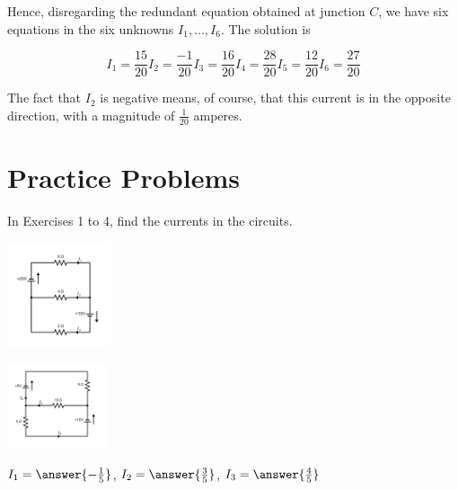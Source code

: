 \documentclass{ximera}
\begin{document}
\begin{example}
\begin{explanation}
Hence, disregarding the redundant equation obtained at junction $C$, we have six equations in the six unknowns $I_1, \dots, I_6$. The solution is

$$	I_1 = \frac{15}{20} I_2 = \frac{-1}{20}I_3 = \frac{16}{20} I_4 = \frac{28}{20}I_5 = \frac{12}{20}I_6 = \frac{27}{20}$$

The fact that $I_2$ is negative means, of course, that this current is in the opposite direction, with a magnitude of $\frac{1}{20}$ amperes.

\end{explanation}

\end{example}

\section*{Practice Problems}

In Exercises 1 to 4, find the currents in the circuits.

\begin{problem}\label{prob:circuit1}
\begin{image}
   
\includegraphics[height=1.2in]{circuit2.jpg}~
 
\end{image}
\end{problem}

\begin{problem}\label{prob:circuit2}

\begin{image}
   
\includegraphics[height=1in]{circuit3.jpg}~
 
\end{image}


$ I_1 = \answer{-\frac{1}{5}}$, $I_2 = \answer{\frac{3}{5}}$, $I_3 = \answer{\frac{4}{5}}$


\end{problem}
\end{document}
